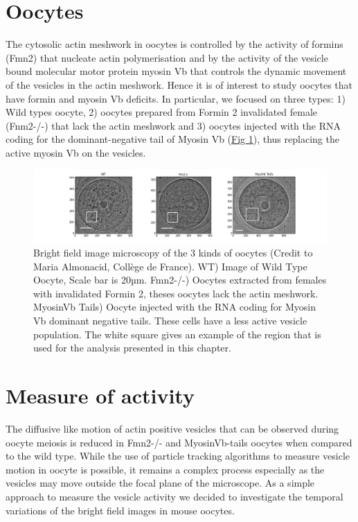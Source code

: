 \documentclass[A4paperpaper,11pt,english]{sphinxmanual}
\begin{document}
\section{Oocytes}
\label{index-latex:oocytes}
The cytosolic actin meshwork in oocytes is controlled by the activity of formins (Fmn2) that
nucleate actin polymerisation and by the activity of the vesicle bound molecular motor protein myosin Vb that
controls the dynamic movement of the
vesicles in the actin meshwork. Hence it is of interest to study oocytes that have formin and myosin Vb deficits.
In particular, we focused on three types: 1) Wild types oocyte, 2) oocytes prepared from Formin 2 invalidated female
(Fnm2-/-) that lack the
actin meshwork and 3) oocytes injected with the RNA coding for the dominant-negative tail of Myosin
Vb (\hyperref[index-latex:fig3oo]{Fig  \ref*{index-latex:fig3oo}}), thus replacing the active myosin Vb on the vesicles.
\begin{figure}[htbp]
\centering
\capstart

\includegraphics[width=1.000\linewidth]{3-oocytes.png}
\caption{Bright field image microscopy of the 3 kinds of oocytes (Credit to Maria
Almonacid, Collège de France). WT) Image of Wild Type Oocyte, Scale bar is
20µm. Fmn2-/-) Oocytes extracted from females with invalidated Formin 2,
theses oocytes lack the actin meshwork. MyosinVb Tails) Oocyte injected
with the RNA coding for Myosin Vb dominant negative tails. These cells have a less active vesicle
population. The white square gives an example of the region that is used for the analysis presented in this chapter.}\label{index-latex:fig3oo}\end{figure}


\section{Measure of activity}
\label{index-latex:measure-of-activity}
The diffusive like motion of actin positive vesicles that can be observed during oocyte meiosis is
reduced in Fmn2-/- and MyosinVb-tails oocytes when compared to the wild type.
While the use of particle tracking algorithms to measure vesicle motion in oocyte is possible, it remains a
complex process especially as the vesicles may move outside the focal
plane of the microscope. As a simple approach to measure the vesicle activity we decided to
investigate the temporal variations of the bright field images in mouse oocytes.
\end{document}
